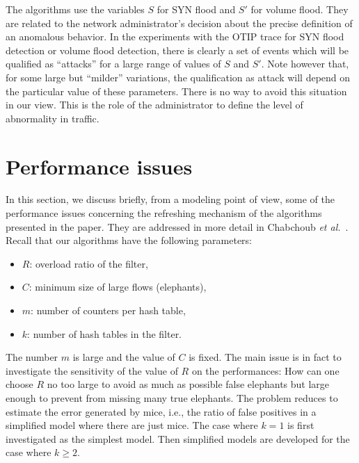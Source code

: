\documentclass{amsart}
\def\etal{{\em et al.}}
\begin{document}
The algorithms use  the variables $S$ for SYN  flood and $S'$ for volume  flood.  They are
related  to  the network  administrator's  decision about  the  precise  definition of  an
anomalous behavior.   In the experiments  with the OTIP  trace for SYN flood  detection or
volume  flood detection,  there is  clearly a  set of  events which  will be  qualified as
``attacks'' for a large range of values of $S$ and $S'$. Note however that, for some large
but ``milder'' variations, the qualification as attack will depend on the particular value
of these parameters. There is no way to avoid this situation in our view. This is the role
of the administrator to define the level of abnormality in traffic.

\section{Performance issues} \label{discussion}
In  this section,  we  discuss  briefly, from  a  modeling point  of  view,  some of  the
performance issues concerning the refreshing  mechanism of the algorithms presented in the
paper.      They     are      addressed      in     more      detail     in      Chabchoub
\etal~\cite{Chabchoub:02,Chabchoub-3}.   Recall  that our  algorithms  have the  following
parameters:
\begin{itemize}
\item $R$: overload ratio of the filter,
\item $C$: minimum size of large flows (elephants), 
\item $m$: number of counters per hash table,
\item $k$: number of hash tables in the filter.
\end{itemize}
The number  $m$ is large  and the value  of $C$ is  fixed.  The main  issue is in  fact to
investigate the sensitivity  of the value of  $R$ on the performances: How  can one choose
$R$ no too large to avoid as much  as possible false elephants but large enough to prevent
from missing many true elephants.  The  problem reduces to estimate the error generated by
mice, i.e., the ratio of false positives  in a simplified model where there are just mice.
The case where $k=1$ is first  investigated as the simplest model.  Then simplified models
are developed for the case where $k\geq 2$.
\end{document}
